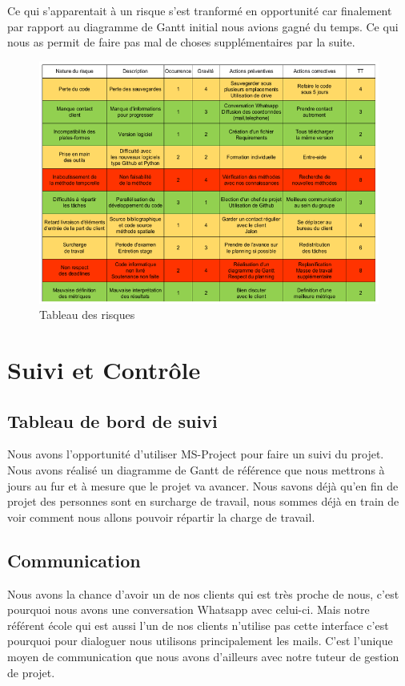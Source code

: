 \documentclass[a4paper,12pt]{report}
\theoremstyle{break}
\begin{document}
 Ce qui s'apparentait à un risque s'est tranformé en opportunité car finalement par rapport au diagramme de Gantt initial nous avions gagné du temps. Ce qui nous as permit de faire pas mal de choses supplémentaires par la suite.

\begin{figure}[h] 
     \centering
       \includegraphics[width=\textwidth]{images/matrice.png}
       \caption{Tableau des risques}
       \label{Tab risque}
  \end{figure}
    
\section{Suivi et Contrôle}
\subsection{Tableau de bord de suivi}
    Nous avons l’opportunité d’utiliser MS-Project pour faire un suivi du projet. Nous avons réalisé un diagramme de Gantt de référence que nous mettrons à jours au fur et à mesure que le projet va avancer. Nous savons déjà qu’en fin de projet des personnes sont en surcharge de travail, nous sommes déjà en train de voir comment nous allons pouvoir répartir la charge de travail. 

\subsection{Communication }

    Nous avons la chance d’avoir un de nos clients qui est très proche de nous, c’est pourquoi nous avons une conversation Whatsapp avec celui-ci. Mais notre référent école qui est aussi l’un de nos clients n’utilise pas cette interface c’est pourquoi pour dialoguer nous utilisons principalement les mails. C’est l’unique moyen de communication que nous avons d’ailleurs avec notre tuteur de gestion de projet. 
    
\end{document}
